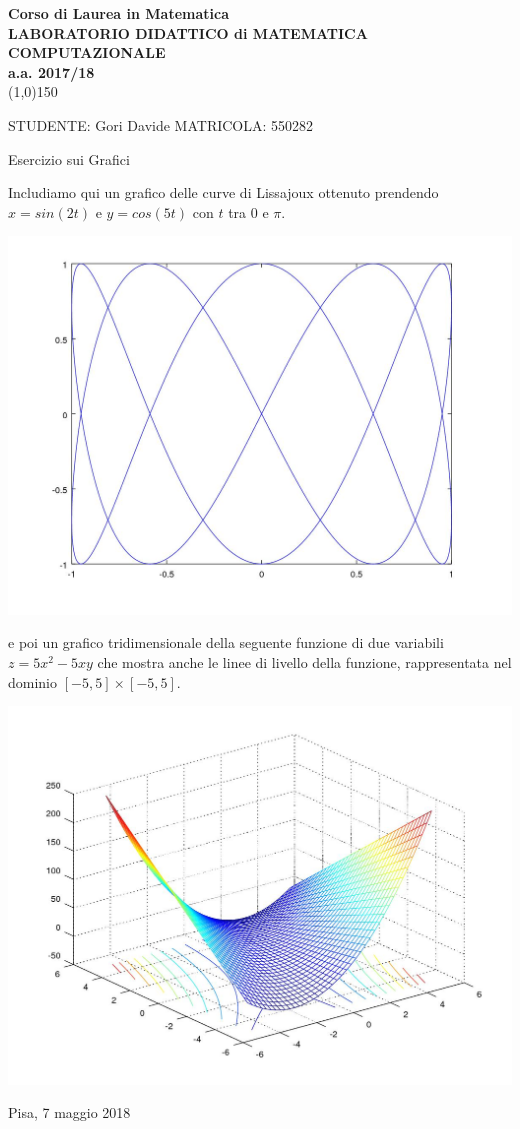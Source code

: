\documentclass[a4paper,11pt] {article}
\begin{document}
\begin{center}
\textbf{
Corso di Laurea in Matematica
\\
LABORATORIO DIDATTICO di MATEMATICA COMPUTAZIONALE
\\
a.a. 2017/18
\\
}
\line(1,0){150}
\end{center}

STUDENTE: Gori Davide
MATRICOLA: 550282
\begin{center}
	Esercizio sui Grafici
\end{center}

	Includiamo qui un grafico delle curve di Lissajoux ottenuto prendendo $x = sin(2t)$ e $y = cos(5t)$ con $t$ tra $0$ e $\pi$.
	
	\includegraphics[width=\textwidth]{gra_1.jpeg}
	
	e poi un grafico tridimensionale della seguente funzione di due variabili $z=5 x^2-5 xy$ che mostra anche le linee di livello della funzione, rappresentata nel dominio $[-5, 5] \times [-5, 5]$.

	\includegraphics[width=\textwidth]{gra_2.jpeg}
	
	Pisa, 7 maggio 2018
\end{document}
